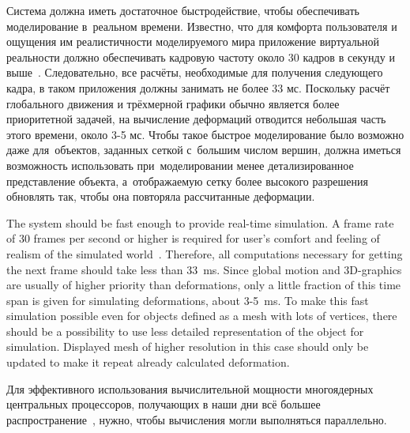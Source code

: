 \documentclass[a4paper, 12pt, titlepage]{extarticle}
\begin{document}
\begin{original}
    Система должна иметь достаточное быстродействие, чтобы обеспечивать моделирование в~реальном
    времени. Известно, что для комфорта пользователя и ощущения им реалистичности моделируемого мира
    приложение виртуальной реальности должно обеспечивать кадровую частоту около 30 кадров в секунду %
    и выше~\cite{claypool-framerate}. Следовательно, все расчёты, необходимые для получения
    следующего кадра, в таком приложения должны занимать не более 33 мс. Поскольку расчёт глобального
    движения и трёхмерной графики обычно является более приоритетной задачей, на вычисление
    деформаций отводится небольшая часть этого времени, около 3-5 мс. Чтобы такое быстрое
    моделирование было возможно даже для~объектов, заданных сеткой с~большим числом вершин,
    должна иметься возможность использовать при~моделировании менее детализированное представление
    объекта, а~отображаемую сетку более высокого разрешения обновлять так, чтобы она повторяла
    рассчитанные деформации. %
\end{original}

    The system should be fast enough to provide real-time simulation. A frame rate of 30 frames per
    second or higher is required for user's comfort and feeling of realism of the simulated
    world~\cite{claypool-framerate}. Therefore, all computations necessary for getting the next
    frame should take less than 33~ms. Since global motion and 3D-graphics are usually of
    higher priority than deformations, only a little fraction of this time span is given for
    simulating deformations, about 3-5~ms. To make this fast simulation possible even for objects
    defined as a mesh with lots of vertices, there should be a possibility to use less detailed
    representation of the object for simulation. Displayed mesh of higher resolution in this case
    should only be updated to make it repeat already calculated deformation.

\begin{original}
    Для эффективного использования вычислительной мощности многоядерных центральных процессоров,
    получающих в наши дни всё большее распространение~\cite{steam-hardware}, нужно, чтобы вычисления могли
    выполняться параллельно.
\end{original}
\end{document}
